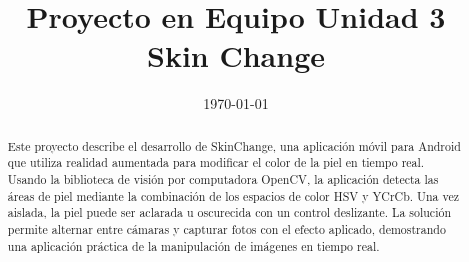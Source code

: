 \documentclass[conference]{IEEEtran}
\date{\specialdate\today}
\begin{document}
%
%
%

\newcommand{\breite}{0.9} %
\newcommand{\RelacionFiguradoscolumnas}{0.9}
\newcommand{\RelacionFiguradoscolumnasPuntoCinco}{0.45}




\title{Proyecto en Equipo Unidad 3 \\  Skin Change}

\author{
}



\maketitle

\begin{abstract} 
Este proyecto describe el desarrollo de SkinChange, una aplicación móvil para Android que utiliza realidad aumentada para modificar el color de la piel en tiempo real. Usando la biblioteca de visión por computadora OpenCV, la aplicación detecta las áreas de piel mediante la combinación de los espacios de color HSV y YCrCb\cite{c1}. Una vez aislada, la piel puede ser aclarada u oscurecida con un control deslizante. La solución permite alternar entre cámaras y capturar fotos con el efecto aplicado, demostrando una aplicación práctica de la manipulación de imágenes en tiempo real.
\end{abstract}
\end{document}
